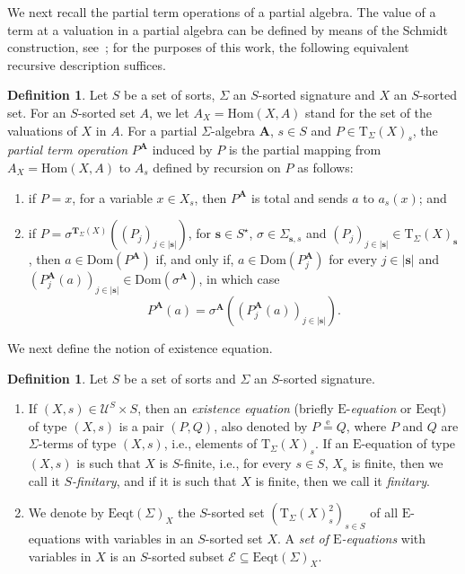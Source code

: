 \documentclass[a4paper, reqno]{amsbook}
\newcommand{\bb}[1]{\ensuremath{\lvert #1 \rvert}}
\newcommand{\eeq}{\overset{\mathrm e}{=}}      %
\newcommand{\Dom}{\mathrm{Dom}}
\theoremstyle{plain}
\theoremstyle{definition}
\newtheorem{definition}[theorem]{Definition}
\begin{document}
We next recall the partial term operations of a partial algebra.
The value of a term at a valuation in a partial algebra can be defined by means of the Schmidt construction, see~\cite{Schmidt1970, ClimentCosme2023}; for the purposes of this work, the following equivalent recursive description suffices.

\begin{definition}\label{DTermOp}
Let $S$ be a set of sorts, $\Sigma$ an $S$-sorted signature and $X$ an $S$-sorted set.
For an $S$-sorted set $A$, we let $A_{X}=\mathrm{Hom}(X,A)$ stand for the set of the valuations of $X$ in $A$.
For a partial $\Sigma$-algebra $\mathbf{A}$, $s\in S$ and $P\in\mathrm{T}_{\Sigma}(X)_{s}$, the \emph{partial term operation} $P^{\mathbf{A}}$ induced by $P$ is the partial mapping from $A_{X}=\mathrm{Hom}(X,A)$ to $A_{s}$ defined by recursion on $P$ as follows:
\begin{enumerate}
\item if $P=x$, for a variable $x\in X_{s}$, then $P^{\mathbf{A}}$ is total and sends $a$ to $a_{s}(x)$; and
\item if $P=\sigma^{\mathbf{T}_{\Sigma}(X)}((P_{j})_{j\in\bb{\mathbf{s}}})$, for $\mathbf{s}\in S^{\star}$, $\sigma\in\Sigma_{\mathbf{s},s}$ and $(P_{j})_{j\in\bb{\mathbf{s}}}\in\mathrm{T}_{\Sigma}(X)_{\mathbf{s}}$, then $a\in\Dom(P^{\mathbf{A}})$ if, and only if, $a\in\Dom(P_{j}^{\mathbf{A}})$ for every $j\in\bb{\mathbf{s}}$ and $(P_{j}^{\mathbf{A}}(a))_{j\in\bb{\mathbf{s}}}\in\Dom(\sigma^{\mathbf{A}})$, in which case
$$
P^{\mathbf{A}}(a)=\sigma^{\mathbf{A}}\left((P_{j}^{\mathbf{A}}(a))_{j\in\bb{\mathbf{s}}}\right).
$$
\end{enumerate}
\end{definition}

We next define the notion of existence equation.

\begin{definition}\label{DExistenceEq}
Let $S$ be a set of sorts and $\Sigma$ an $S$-sorted signature.
\begin{enumerate}
\item If $(X,s)\in\boldsymbol{\mathcal{U}}^{S}\times S$, then an \emph{existence equation} (briefly $\mathrm{E}$-\emph{equation} or $\mathrm{Eeqt}$) of type $(X,s)$ is a pair $(P,Q)$, also denoted by $P\eeq Q$, where $P$ and $Q$ are $\Sigma$-terms of type $(X,s)$, i.e., elements of $\mathrm{T}_{\Sigma}(X)_{s}$.
If an $\mathrm{E}$-equation of type $(X,s)$ is such that $X$ is $S$-finite, i.e., for every $s\in S$, $X_{s}$ is finite, then we call it $S$\emph{-finitary}, and if it is such that $X$ is finite, then we call it \emph{finitary}.
\item We denote by $\mathrm{Eeqt}(\Sigma)_{X}$ the $S$-sorted set $(\mathrm{T}_{\Sigma}(X)_{s}^{2})_{s\in S}$ of all $\mathrm{E}$-equations with variables in an $S$-sorted set $X$.
A \emph{set of $\mathrm{E}$-equations} with variables in $X$ is an $S$-sorted subset $\mathcal{E}\subseteq\mathrm{Eeqt}(\Sigma)_{X}$.
\end{enumerate}
\end{definition}
\end{document}
